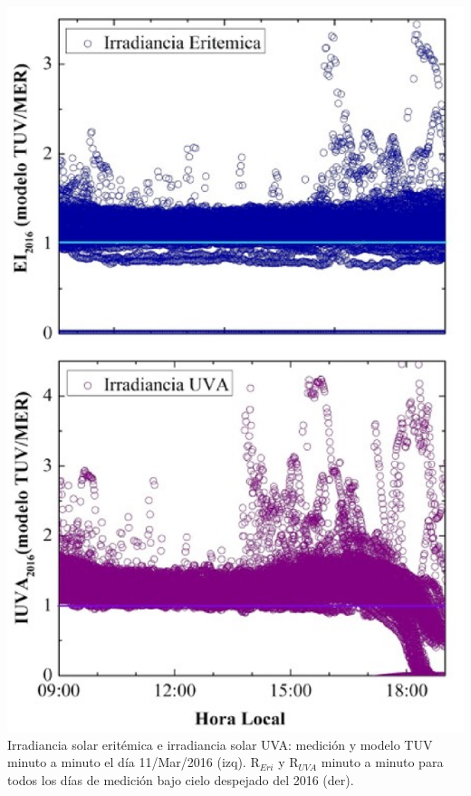 \documentclass{article}
\begin{document}
\begin{minipage}{0.52\linewidth}
\includegraphics[scale=0.4]{images/uvaanual.eps}\\
\changefontsizes{9.5pt}
\textcolor{bl}{Irradiancia solar eritémica e irradiancia solar UVA: medición y modelo TUV minuto a minuto el día 11/Mar/2016 (izq). R$_{Eri}$ y R$_{UVA}$ minuto a minuto
para todos los días de medición bajo cielo despejado del 2016 (der).}
\end{minipage}
\end{document}
